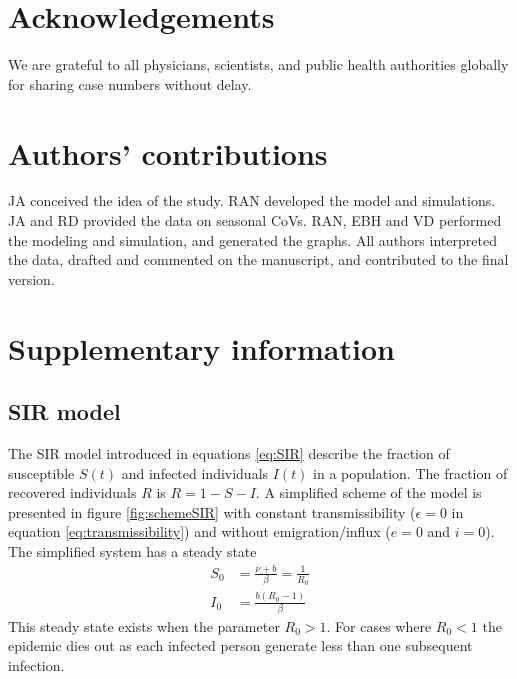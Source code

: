 \documentclass[rmp, reprint, superscriptaddress, floatfix,amsmath]{revtex4-1}
\begin{document}
\section*{Acknowledgements}
We are grateful to all physicians, scientists, and public health authorities globally for sharing case numbers without delay.

\section*{Authors' contributions}
JA conceived the idea of the study. RAN developed the model and simulations. JA and RD provided the data on seasonal CoVs. RAN, EBH and VD performed the modeling and simulation, and generated the graphs. All authors interpreted the data, drafted and commented on the manuscript, and contributed to the final version. 



\newpage

\appendix
\setcounter{figure}{0}
\renewcommand{\figurename}{Figure S}
\setcounter{table}{0}
\renewcommand{\tablename}{Table S}

\section*{Supplementary information}

\subsection{SIR model}

The SIR model introduced in equations \ref{eq:SIR} describe the fraction of susceptible $S(t)$ and infected individuals $I(t)$ in a population. 
The fraction of recovered individuals $R$ is $R=1 - S - I$. 
A simplified scheme of the model is presented in figure \ref{fig:schemeSIR} with constant transmissibility ($\epsilon=0$ in equation \ref{eq:transmissibility}) and without emigration/influx ($e=0$ and $i=0$).
The simplified system has a steady state
\begin{equation}
\begin{split}
S_0 &= \frac{\nu + b}{\beta} = \frac{1}{R_0} \\
I_0 & = \frac{b(R_0-1)}{\beta}
\end{split}
\label{eq:fixed_point}
\end{equation}
This steady state exists when the parameter $R_0 > 1$. For cases where $R_0 < 1$ the epidemic dies out as each infected person generate less than one subsequent infection. 
\end{document}
